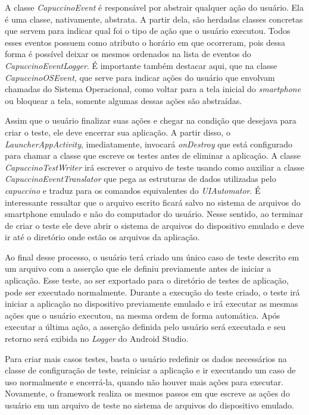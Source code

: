 \documentclass[
    12pt,       %
    openright,      %
    twoside,      %
    a4paper,      %
    english,      %
    french,       %
    spanish,      %
    brazil,       %
    ]{abntex2}
\begin{document}
          A classe \textit{CapuccinoEvent} é responsável por abstrair qualquer ação do usuário. Ela é uma
          classe, nativamente, abstrata. A partir dela, são herdadas classes concretas que servem para indicar
          qual foi o tipo de ação que o usuário executou. Todos esses eventos possuem como atributo o horário
          em que ocorreram, pois dessa forma é possível deixar os mesmos ordenados na lista de eventos do
          \textit{CapuccinoEventLogger}. É importante também destacar aqui, que na classe \textit{CapuccinoOSEvent},
          que serve para indicar ações do usuário que envolvam chamadas do Sistema Operacional, como voltar
          para a tela inicial do \textit{smartphone} ou bloquear a tela, somente algumas dessas ações são
          abstraídas.

          Assim que o usuário finalizar suas ações e chegar na condição que desejava para criar o teste, ele
          deve encerrar sua aplicação. A partir disso, o \textit{LauncherAppActivity}, imediatamente, invocará
          \textit{onDestroy} que está configurado para chamar a classe que escreve os testes antes de eliminar
          a aplicação. A classe \textit{CapuccinoTestWriter} irá escrever o arquivo de teste usando como auxiliar
          a classe \textit{CapuccinoEventTranslator} que pega as estruturas de dados utilizadas pelo
          \textit{capuccino} e traduz para os comandos equivalentes do \textit{UIAutomator}. É interessante
          ressaltar que o arquivo escrito ficará salvo no sistema de arquivos do smartphone emulado e não
          do computador do usuário. Nesse sentido, ao terminar de criar o teste ele deve abrir o sistema
          de arquivos do dispositivo emulado e deve ir até o diretório onde estão os arquivos da aplicação.

          Ao final desse processo, o usuário terá criado um único caso de teste descrito em um arquivo com a
          asserção que ele definiu previamente antes de iniciar a aplicação. Esse teste, ao ser exportado
          para o diretório de testes de aplicação, pode ser executado normalmente. Durante a execução do
          teste criado, o teste irá iniciar a aplicação no dispositivo previamente emulado e irá executar
          as mesmas ações que o usuário executou, na mesma ordem de forma automática. Após executar a última
          ação, a asserção definida pelo usuário será executada e seu retorno será exibida no \textit{Logger}
          do Android Studio.

          Para criar mais casos testes, basta o usuário redefinir os dados necessários na classe de configuração
          de teste, reiniciar a aplicação e ir executando um caso de uso normalmente e encerrá-la, quando não
          houver mais ações para executar. Novamente, o framework realiza os mesmos passos em que escreve as
          ações do usuário em um arquivo de teste no sistema de arquivos do dispositivo emulado.
\end{document}
